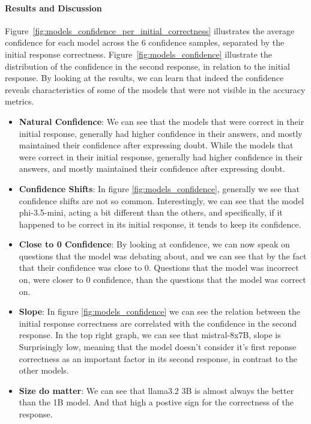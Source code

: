 \paragraph{Results and Discussion}

Figure~\ref{fig:models_confidence_per_initial_correctness} illustrates the average confidence for each model across the 6 confidence samples, separated by the initial response correctness. Figure~\ref{fig:models_confidence} illustrate the distribution of the confidence in the second response, in relation to the initial response. By looking at the results, we can learn that indeed the confidence reveals characteristics of some of the models that were not visible in the accuracy metrics.
\begin{itemize}
  \item \textbf{Natural Confidence}: We can see that the models that were correct in their initial response, generally had higher confidence in their answers, and mostly maintained their confidence after expressing doubt. While the models that were correct in their initial response, generally had higher confidence in their answers, and mostly maintained their confidence after expressing doubt.
  \item \textbf{Confidence Shifts}: In figure \ref{fig:models_confidence}, generally we see that confidence shifts are  not so common. Interestingly, we can see that the model phi-3.5-mini, acting a bit different than the others, and specifically, if it happened to be correct in its initial response, it tends to keep its confidence.
  \item \textbf{Close to 0 Confidence}: By looking at confidence, we can now speak on questions that the model was debating about, and we can see that by the fact that their confidence was close to 0. Questions that the model was incorrect on, were closer to 0 confidence, than the questions that the model was correct on.
  \item \textbf{Slope}: In figure \ref{fig:models_confidence} we can see the relation between the initial response correctness are correlated with the confidence in the second response. In the top right graph, we can see that mistral-8x7B, slope is Surprisingly low, meaning that the model doesn't consider it's first reponse correctness as an important factor in its second response, in contrast to the other models.
  \item \textbf{Size do matter}: We can see that llama3.2 3B is almost always the better than the 1B model. And that high a postive sign for the correctness of the response.
\end{itemize}

